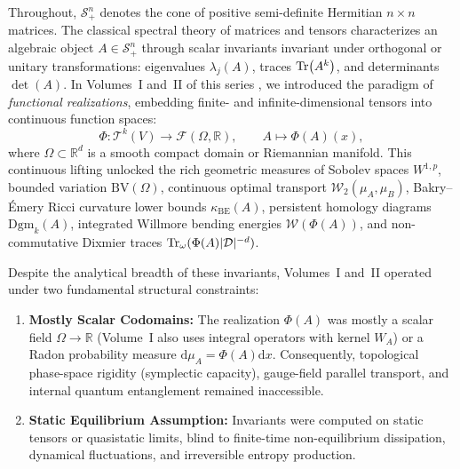 \documentclass[11pt,a4paper,reqno]{amsart}
\theoremstyle{definition}
\theoremstyle{remark}
\numberwithin{equation}{section}
\newcommand{\dif}{\mathrm{d}}
\begin{document}
Throughout, $\mathcal{S}_+^n$ denotes the cone of positive semi-definite Hermitian $n\times n$ matrices. The classical spectral theory of matrices and tensors characterizes an algebraic object $A \in \mathcal{S}_+^n$ through scalar invariants invariant under orthogonal or unitary transformations: eigenvalues $\lambda_j(A)$, traces $\Tr(A^k)$, and determinants $\det(A)$. In Volumes~I and~II of this series \cite{SilvaFilhoBTS}, we introduced the paradigm of \emph{functional realizations}, embedding finite- and infinite-dimensional tensors into continuous function spaces:
\begin{equation}
\Phi \colon \mathcal{T}^k(V) \longrightarrow \mathcal{F}(\Omega, \mathbb{R}), \qquad A \longmapsto \Phi(A)(x),
\end{equation}
where $\Omega \subset \mathbb{R}^d$ is a smooth compact domain or Riemannian manifold. This continuous lifting unlocked the rich geometric measures of Sobolev spaces $W^{1,p}$, bounded variation $\mathrm{BV}(\Omega)$, continuous optimal transport $\mathcal{W}_2(\mu_A, \mu_B)$, Bakry--Émery Ricci curvature lower bounds $\kappa_{\mathrm{BE}}(A)$, persistent homology diagrams $\mathrm{Dgm}_k(A)$, integrated Willmore bending energies $\mathcal{W}(\Phi(A))$, and non-commutative Dixmier traces $\Tr_\omega(\Phi(A) |\mathcal{D}|^{-d})$.

Despite the analytical breadth of these invariants, Volumes~I and~II operated under two fundamental structural constraints:
\begin{enumerate}
    \item \textbf{Mostly Scalar Codomains:} The realization $\Phi(A)$ was mostly a scalar field $\Omega \to \mathbb{R}$ (Volume~I also uses integral operators with kernel $W_A$) or a Radon probability measure $\dif\mu_A = \Phi(A) \dif x$. Consequently, topological phase-space rigidity (symplectic capacity), gauge-field parallel transport, and internal quantum entanglement remained inaccessible.
    \item \textbf{Static Equilibrium Assumption:} Invariants were computed on static tensors or quasistatic limits, blind to finite-time non-equilibrium dissipation, dynamical fluctuations, and irreversible entropy production.
\end{enumerate}
\end{document}
